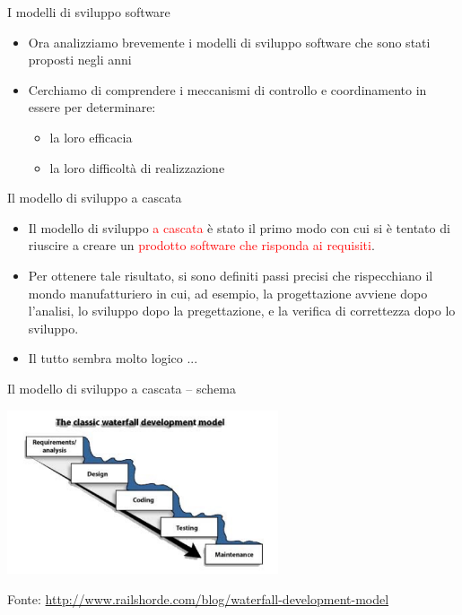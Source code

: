 \documentclass{beamer}
\begin{document}
\begin{frame}{\centerline{I modelli di sviluppo software}}

\begin{itemize}
\item Ora analizziamo brevemente i modelli di sviluppo software che sono stati proposti negli anni
\item Cerchiamo di comprendere i meccanismi di controllo e coordinamento in essere per determinare:
\begin{itemize}
\item la loro efficacia
\item la loro difficolt\`{a} di realizzazione 
\end{itemize}
\end{itemize}
\end{frame}


\begin{frame}{\centerline{Il modello di sviluppo a cascata}}


\begin{itemize}
    \item Il modello di sviluppo \textcolor{red}{a cascata} \`{e} stato il primo modo con cui si \`{e} tentato di riuscire a creare un \textcolor{red}{prodotto software che risponda ai requisiti}.
    \item Per ottenere tale risultato, si sono definiti passi precisi che rispecchiano il mondo manufatturiero in cui, ad esempio, la progettazione avviene dopo l'analisi, lo sviluppo dopo la pregettazione, e la verifica di correttezza dopo lo sviluppo.
\item Il tutto sembra molto logico ...
\end{itemize}


\end{frame}

\begin{frame}{\centerline{Il modello di sviluppo a cascata -- schema}}


\begin{center}
\includegraphics[width=80mm]{A2022.IDSEPC.ProcessoDiProduzione/img-02.png}
\end{center}
\vspace{0.5cm}

\begin{center}
\tiny
Fonte: \url{http://www.railshorde.com/blog/waterfall-development-model}

\end{center}
\end{frame}
\end{document}
